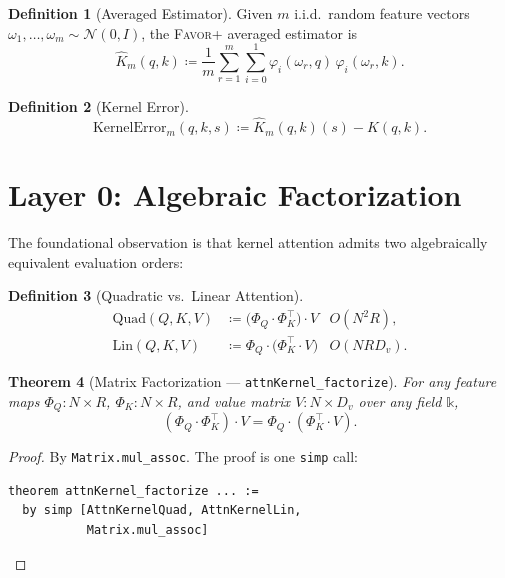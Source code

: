 \documentclass[11pt,a4paper,twocolumn]{article}
\newtheorem{theorem}{Theorem}[section]
\theoremstyle{definition}
\newtheorem{definition}[theorem]{Definition}
\theoremstyle{remark}
\newcommand{\favor}{\textsc{Favor+}}
\newcommand{\leancode}[1]{\texttt{\color{leanblue}#1}}
\begin{document}
\begin{definition}[Averaged Estimator]
\label{def:estimator}
Given $m$ i.i.d.\ random feature vectors
$\omega_1, \ldots, \omega_m \sim \mathcal{N}(0, I)$, the \favor{} averaged
estimator is
\begin{equation}
  \hat{K}_m(q, k)
  \coloneqq
  \frac{1}{m} \sum_{r=1}^{m}
    \sum_{i=0}^{1} \varphi_i(\omega_r, q)\,\varphi_i(\omega_r, k).
\end{equation}
\end{definition}

\begin{definition}[Kernel Error]
\label{def:error}
\begin{equation}
  \mathrm{KernelError}_m(q,k,s)
  \coloneqq \hat{K}_m(q,k)(s) - K(q,k).
\end{equation}
\end{definition}


\section{Layer 0: Algebraic Factorization}
\label{sec:layer0}

The foundational observation is that kernel attention admits two
algebraically equivalent evaluation orders:

\begin{definition}[Quadratic vs.\ Linear Attention]
\begin{align}
  \text{Quad}(Q,K,V) &\coloneqq \bigl(\Phi_Q \cdot \Phi_K^\top\bigr) \cdot V
    & O(N^2 R), \\
  \text{Lin}(Q,K,V) &\coloneqq \Phi_Q \cdot \bigl(\Phi_K^\top \cdot V\bigr)
    & O(N R D_v).
\end{align}
\end{definition}

\begin{theorem}[Matrix Factorization — \leancode{attnKernel\_factorize}]
\label{thm:factor}
For any feature maps $\Phi_Q : N \times R$, $\Phi_K : N \times R$, and
value matrix $V : N \times D_v$ over any field $\mathbb{k}$,
\begin{equation}
  (\Phi_Q \cdot \Phi_K^\top) \cdot V
  = \Phi_Q \cdot (\Phi_K^\top \cdot V).
\end{equation}
\end{theorem}

\begin{proof}
By \leancode{Matrix.mul\_assoc}. The proof is one \texttt{simp} call:
\begin{lstlisting}
theorem attnKernel_factorize ... :=
  by simp [AttnKernelQuad, AttnKernelLin,
           Matrix.mul_assoc]
\end{lstlisting}
\end{proof}
\end{document}

